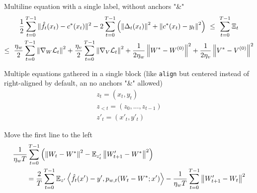 \documentclass{article}
\begin{document}
Multiline equation with a single label, without anchors "\&"
\begin{multline}
    \frac{1}{2} \sum_{t=0}^{T-1} \| \hat{f}_t(x_t) - c^*(x_t) \|^2 
    - 2 \sum_{t=0}^{T-1} \left( \left\lVert \Delta_t(x_t) \right\rVert^2 + \left\lVert c^*(x_t) - y_t \right\rVert^2 \right)
    ~\leq~ \sum_{t=0}^{T-1} \Xi_t \\
    \leq~ \frac{\eta_w}{2} \sum_{t=0}^{T-1} \left\lVert \nabla_{W} \mathcal{L}_t \right\rVert^2 + \frac{\eta_v}{2} \sum_{t=0}^{T-1} \left\lVert \nabla_{V} \mathcal{L}_t \right\rVert^2
    + \frac{1}{2\eta_w}\left\lVert W^*-W^{(0)} \right\rVert^2 + \frac{1}{2\eta_v}\left\lVert V^*-V^{(0)} \right\rVert^2
\end{multline}

Multiple equations gathered in a single block (like \texttt{align} but centered instead of right-aligned by default, an no anchors "\&" allowed)
\begin{gather}
    z_t = (x_t,y_t) \\
    z_{<t} = (z_0, ..., z_{t-1}) \\
    z'_t = (x'_t,y'_t)
\end{gather}

Move the first line to the left
\begin{align}
    \MoveEqLeft \frac{1}{\eta_w T} \sum_{t=0}^{T-1} \left( \norm{W_t - W^*}^2 - \EE_{z'_t} \norm{W'_{t+1} - W^*}^2 \right) \\
    &= \frac{2}{T} \sum_{t=0}^{T-1} \EE_{z'} \left\langle \hf_t(x') - y', p_{w,t}(W_t - W^*; x') \right\rangle
    - \frac{1}{\eta_w T} \sum_{t=0}^{T-1} \norm{W'_{t+1} - W_t}^2 
\end{align}
\end{document}

